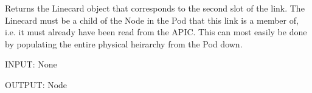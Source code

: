 \documentclass[letterpaper,10pt,english]{sphinxmanual}
\begin{document}
\begin{fulllineitems}

\begin{fulllineitems}
\label{aciphysobject:aciphysobject.Link.get_slot2}
Returns the Linecard object that corresponds to the second slot of the link.  The Linecard must be a child of
the Node in the Pod that this link is a member of, i.e. it must already have been read from the APIC.  This can
most easily be done by populating the entire physical heirarchy from the Pod down.

INPUT: None

OUTPUT: Node

\end{fulllineitems}


\end{fulllineitems}

\end{document}

